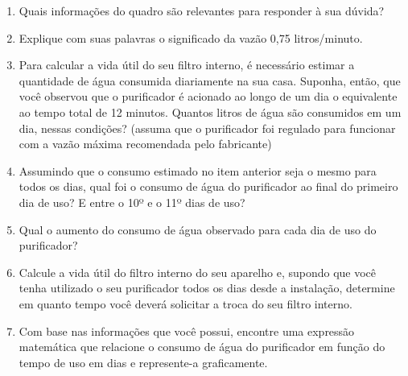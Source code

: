 \documentclass[10 pt,usenames,dvipsnames, oneside]{article}
\begin{document}
\begin{enumerate}
\item Quais informações do quadro são relevantes para responder à sua dúvida?

\item Explique com suas palavras o significado da vazão 0,75 litros/minuto.

\item Para calcular a vida útil do seu filtro interno, é necessário estimar a quantidade de água consumida diariamente na sua casa. Suponha, então, que você observou que o purificador é acionado ao longo de um dia o equivalente ao tempo total de 12 minutos. Quantos litros de água são consumidos em um dia, nessas condições? (assuma que o purificador foi regulado para funcionar com a vazão máxima recomendada pelo fabricante)

\item Assumindo que o consumo estimado no item anterior seja o mesmo para todos os dias, qual foi o consumo de água do purificador ao final do primeiro dia de uso? E entre o 10º e o 11º dias de uso?

\item Qual o aumento do consumo de água observado para cada dia de uso do purificador?

\item Calcule a vida útil do filtro interno do seu aparelho e, supondo que você tenha utilizado o seu purificador todos os dias desde a instalação, determine em quanto tempo você deverá solicitar a troca do seu filtro interno.

\item Com base nas informações que você possui, encontre uma expressão matemática que relacione o consumo de água do purificador em função do tempo de uso em dias e represente-a graficamente.
\end{enumerate}
\end{document}
